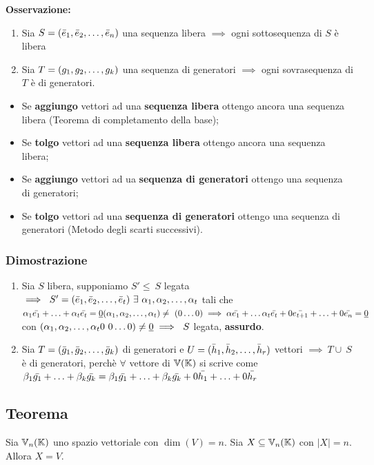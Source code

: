 \documentclass[../main.tex]{subfiles}
\begin{document}
\textbf{Osservazione:}\begin{enumerate}
    \item Sia $S= (\bar{e}_1, \bar{e}_2, \ldots, \bar{e}_{n})$ una sequenza libera $\implies$ ogni sottosequenza di
          $S$ è libera
    \item Sia $T= (g_1, g_2, \ldots, g_{k})$ una sequenza di generatori $\implies$ ogni sovrasequenza di
          $T$ è di generatori.
\end{enumerate}
\begin{itemize}
    \item Se \textbf{aggiungo} vettori ad una \textbf{sequenza libera} ottengo ancora una
          sequenza libera (Teorema di completamento della base);
    \item Se \textbf{tolgo} vettori ad una \textbf{sequenza libera} ottengo ancora una
          sequenza libera;
    \item Se \textbf{aggiungo} vettori ad ua \textbf{sequenza di generatori} ottengo una
          sequenza di generatori;
    \item Se \textbf{tolgo} vettori ad una \textbf{sequenza di generatori} ottengo una
          sequenza di generatori (Metodo degli scarti successivi).
\end{itemize}

\subsubsection{Dimostrazione}
\begin{enumerate}
    \item Sia $S$ libera, supponiamo $S'\leq\ S$ legata $\implies\ S'= (\bar{e}_1, \bar{e}_2, \ldots, \bar{e}_{t})\
              \exists\ \alpha_1, \alpha_2, \ldots, \alpha_{t}$ tali che
          $\alpha_1\bar{e_1}+\ldots+\alpha_t\bar{e_t}=\underbar{0} \\ (\alpha_1, \alpha_2, \ldots, \alpha_{t}) \ne\
              (0\ldots0)
              \implies\alpha\bar{e_1}+\ldots\alpha_t\bar{e_t}+0\bar{e_{t+1}}+\ldots+0\bar{e_n} =
              \underbar{0}$ con $ (\s{\ah}{t}0 \ 0 \ldots0)\ne\underbar{0} \implies\ S$
          legata, \textbf{assurdo}.
    \item Sia $T= (\bar{g}_1, \bar{g}_2, \ldots, \bar{g}_{k})$ di generatori e $U= (\bar{h}_1, \bar{h}_2, \ldots, \bar{h}_{r})$ vettori
          $\implies\ T \cup\ S$ è di generatori, perchè $\forall$ vettore di $\mathbb{V} (\mathbb{K})$ si
          scrive come $\beta_1\bar{g_1}+\ldots+\beta_k\bar{g_k} = \beta_1
              \bar{g_1}+\ldots+\beta_k \bar{g_k} + 0\bar{h_1}+\ldots+0\bar{h_r}$
\end{enumerate}

\subsection{Teorema}
Sia $\mathbb{V}_n (\mathbb{K})$ uno spazio vettoriale con $\dim(V) = n$. Sia $X\subseteq\mathbb{V}_n (\mathbb{K})$
con $|X| = n$. Allora $X = V$.
\end{document}
